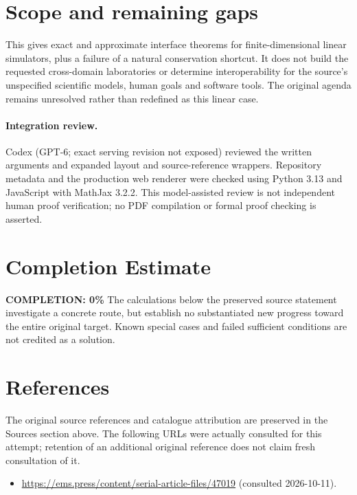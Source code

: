 \documentclass[11pt]{article}
\begin{document}
\section{Scope and remaining gaps}

This gives exact and approximate interface theorems for finite-dimensional
linear simulators, plus a failure of a natural conservation shortcut. It does
not build the requested cross-domain laboratories or determine interoperability
for the source's unspecified scientific models, human goals and software tools.
The original agenda remains unresolved rather than redefined as this linear case.

\paragraph{Integration review.} Codex (GPT-6; exact serving revision not exposed) reviewed the written arguments and expanded layout and source-reference wrappers. Repository metadata and the production web renderer were checked using Python 3.13 and JavaScript with MathJax 3.2.2. This model-assisted review is not independent human proof verification; no PDF compilation or formal proof checking is asserted.

\section{Completion Estimate}
\noindent\textbf{COMPLETION: 0\%}
The calculations below the preserved source statement investigate a concrete route,
but establish no substantiated new progress toward the entire original target.
Known special cases and failed sufficient conditions are not credited as a solution.
\section{References}
The original source references and catalogue attribution are preserved in the
Sources section above. The following URLs were actually consulted for this attempt;
retention of an additional original reference does not claim fresh consultation of it.
\begin{itemize}
\item \url{https://ems.press/content/serial-article-files/47019} (consulted 2026-10-11). 
\end{itemize}
\end{document}
